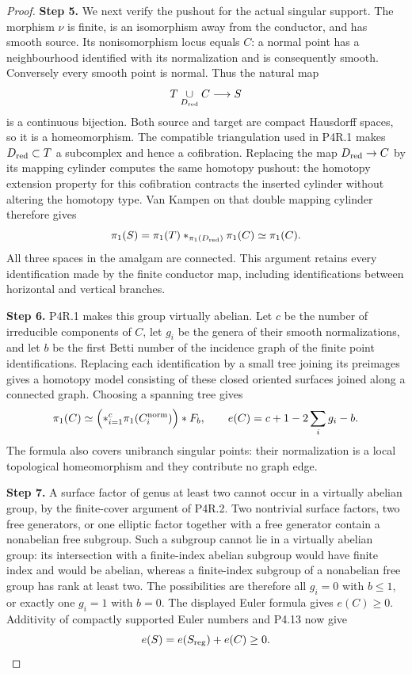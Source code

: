 \begin{proof}
\noindent\textbf{Step 5.} We next verify the pushout for the actual singular
support. The morphism $\nu$ is finite, is an
isomorphism away from the conductor, and has smooth
source. Its nonisomorphism locus equals $C$: a normal
point has a neighbourhood identified with its
normalization and is consequently smooth. Conversely
every smooth point is normal. Thus the natural map
\[
 T\underset{D_{\rm red}}{\cup}C\longrightarrow S
\]
is a continuous bijection. Both source and target are
compact Hausdorff spaces, so it is a homeomorphism.
The compatible triangulation used in P4R.1 makes
$D_{\rm red}\subset T$ a subcomplex and hence a
cofibration. Replacing the map $D_{\rm red}\to C$ by
its mapping cylinder computes the same homotopy
pushout: the homotopy extension property for this
cofibration contracts the inserted cylinder without
altering the homotopy type. Van Kampen on that double
mapping cylinder therefore gives
\[
 \pi_1(S)=\pi_1(T)
       *_{\pi_1(D_{\rm red})}\pi_1(C)
       \simeq\pi_1(C).
\]
All three spaces in the amalgam are connected. This
argument retains every identification made by the
finite conductor map, including identifications
between horizontal and vertical branches.

\noindent\textbf{Step 6.} P4R.1 makes this group virtually abelian. Let $c$ be
the number of irreducible components of $C$, let
$g_i$ be the genera of their smooth normalizations,
and let $b$ be the first Betti number of the incidence
graph of the finite point identifications. Replacing
each identification by a small tree joining its
preimages gives a homotopy model consisting of these
closed oriented surfaces joined along a connected
graph. Choosing a spanning tree gives
\[
 \pi_1(C)\simeq
   \Bigl(*_{i=1}^{c}\pi_1(C_i^{\rm norm})\Bigr)*F_b,
 \qquad
 e(C)=c+1-2\sum_i g_i-b.
\]
The formula also covers unibranch singular points:
their normalization is a local topological
homeomorphism and they contribute no graph edge.

\noindent\textbf{Step 7.} A surface factor of genus at least two cannot occur
in a virtually abelian group, by the finite-cover
argument of P4R.2. Two nontrivial surface factors,
two free generators, or one elliptic factor together
with a free generator contain a nonabelian free
subgroup. Such a subgroup cannot lie in a virtually
abelian group: its intersection with a finite-index
abelian subgroup would have finite index and would
be abelian, whereas a finite-index subgroup of a
nonabelian free group has rank at least two. The
possibilities are therefore all $g_i=0$ with
$b\le1$, or exactly one $g_i=1$ with $b=0$.
The displayed Euler formula gives $e(C)\ge0$.
Additivity of compactly supported Euler numbers and
P4.13 now give
\[
 e(S)=e(S_{\rm reg})+e(C)\ge0.
\]


\end{proof}
